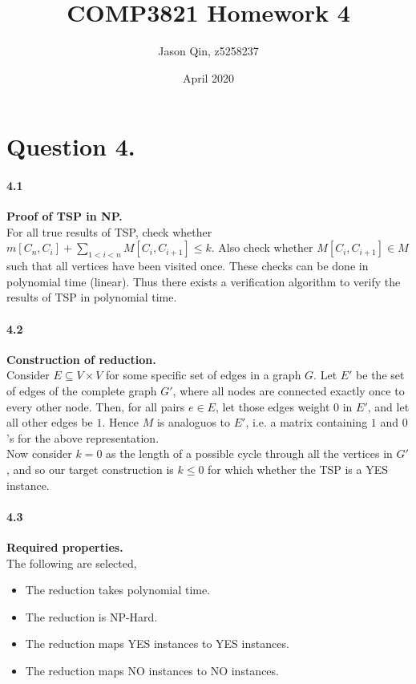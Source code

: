 \documentclass{article}
\title{COMP3821 Homework 4}
\author{Jason Qin, z5258237}
\date{April 2020}
\begin{document}
\maketitle

\section*{Question 4.}
\paragraph*{4.1} \textbf{Proof of TSP in NP.} \\

\noindent
For all true results of TSP, check whether $m[C_n, C_i] + \sum_{1<i<n} M[C_i, C_{i+1}] \leq k$.
Also check whether $M[C_i, C_{i+1}] \in M$ such that all vertices have been visited once.
These checks can be done in polynomial time (linear). Thus there exists a verification algorithm
to verify the results of TSP in polynomial time.

\paragraph*{4.2} \textbf{Construction of reduction.} \\

\noindent
Consider $E \subseteq V \times V$ for some specific set of edges in a graph $G$. Let $E'$ be the set of edges
of the complete graph $G'$, where all nodes are connected exactly once to every other node. Then, for all
pairs $e \in E$, let those edges weight $0$ in $E'$, and let all other edges be $1$. Hence $M$ is analoguos
to $E'$, i.e. a matrix containing $1$ and $0$'s for the above representation. \\

\noindent
Now consider $k = 0$ as the
length of a possible cycle through all the vertices in $G'$, and so our target construction is $k \leq 0$ for which
whether the TSP is a YES instance.

\paragraph*{4.3} \textbf{Required properties.}  \\

\noindent
The following are selected,

\begin{itemize}
    \item The reduction takes polynomial time.
    \item The reduction is NP-Hard.
    \item The reduction maps YES instances to YES instances.
    \item The reduction maps NO instances to NO instances.
    \end{itemize}
\end{document}
